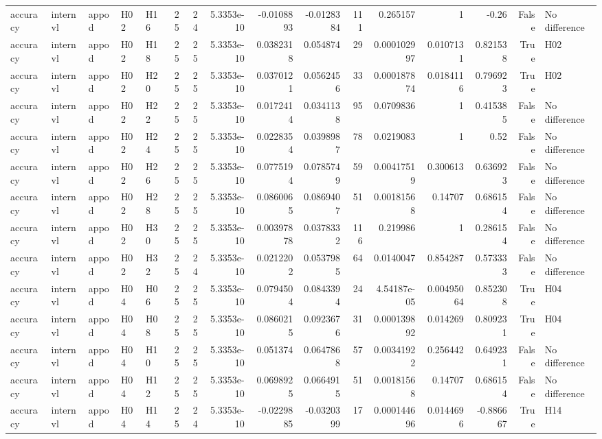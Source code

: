 \begin{longtable}{lllllrrrrrrrrrrl}
accuracy & internvl & appod & H02 & H16 & 25 & 24 & 5.3353e-10 & -0.0108893 & -0.0128384 & 111 & 0.265157 & 1 & -0.26 & False & No difference \\
accuracy & internvl & appod & H02 & H18 & 25 & 25 & 5.3353e-10 & 0.0382318 & 0.054874 & 29 & 0.000102997 & 0.0107131 & 0.821538 & True & H02 \\
accuracy & internvl & appod & H02 & H20 & 25 & 25 & 5.3353e-10 & 0.0370121 & 0.0562456 & 33 & 0.000187874 & 0.0184116 & 0.796923 & True & H02 \\
accuracy & internvl & appod & H02 & H22 & 25 & 25 & 5.3353e-10 & 0.0172414 & 0.0341138 & 95 & 0.0709836 & 1 & 0.415385 & False & No difference \\
accuracy & internvl & appod & H02 & H24 & 25 & 25 & 5.3353e-10 & 0.0228354 & 0.0398987 & 78 & 0.0219083 & 1 & 0.52 & False & No difference \\
accuracy & internvl & appod & H02 & H26 & 25 & 25 & 5.3353e-10 & 0.0775194 & 0.0785749 & 59 & 0.00417519 & 0.300613 & 0.636923 & False & No difference \\
accuracy & internvl & appod & H02 & H28 & 25 & 25 & 5.3353e-10 & 0.0860065 & 0.0869407 & 51 & 0.00181568 & 0.14707 & 0.686154 & False & No difference \\
accuracy & internvl & appod & H02 & H30 & 25 & 25 & 5.3353e-10 & 0.00397878 & 0.0378332 & 116 & 0.219986 & 1 & 0.286154 & False & No difference \\
accuracy & internvl & appod & H02 & H32 & 25 & 24 & 5.3353e-10 & 0.0212202 & 0.0537985 & 64 & 0.0140047 & 0.854287 & 0.573333 & False & No difference \\
accuracy & internvl & appod & H04 & H06 & 25 & 25 & 5.3353e-10 & 0.0794504 & 0.0843394 & 24 & 4.54187e-05 & 0.00495064 & 0.852308 & True & H04 \\
accuracy & internvl & appod & H04 & H08 & 25 & 25 & 5.3353e-10 & 0.0860215 & 0.0923676 & 31 & 0.000139892 & 0.014269 & 0.809231 & True & H04 \\
accuracy & internvl & appod & H04 & H10 & 25 & 25 & 5.3353e-10 & 0.051374 & 0.0647868 & 57 & 0.00341922 & 0.256442 & 0.649231 & False & No difference \\
accuracy & internvl & appod & H04 & H12 & 25 & 25 & 5.3353e-10 & 0.0698925 & 0.0664915 & 51 & 0.00181568 & 0.14707 & 0.686154 & False & No difference \\
accuracy & internvl & appod & H04 & H14 & 25 & 24 & 5.3353e-10 & -0.0229885 & -0.0320399 & 17 & 0.000144696 & 0.0144696 & -0.886667 & True & H14 \\

\end{longtable}
